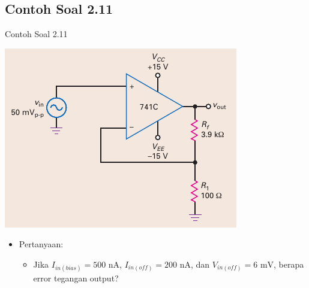 \subsection{Contoh Soal 2.11}
\begin{frame}{Contoh Soal 2.11}
	\begin{multicols}{2}
		\begin{center}
			\includegraphics[width=\linewidth]{gambar/fig-16.22a}
		\end{center}
		\columnbreak
		\begin{itemize}
			\item Pertanyaan:
			\begin{itemize}
				\item Jika $ I_{in(bias)} = 500 \text{ nA} $, $ I_{in(off)} = 200 \text{ nA} $, dan $ V_{in(off)} = 6 \text{ mV} $, berapa error tegangan output?
			\end{itemize}
		\end{itemize}
	\end{multicols}
\end{frame}

